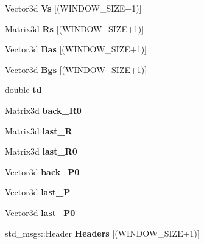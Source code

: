 \begin{DoxyCompactItemize}
Vector3d {\bfseries Vs} \mbox{[}(W\+I\+N\+D\+O\+W\+\_\+\+S\+I\+ZE+1)\mbox{]}
\item 
\mbox{\label{classEstimator_a95fb17a6e27d168aeecfea6debc5b654}} 
Matrix3d {\bfseries Rs} \mbox{[}(W\+I\+N\+D\+O\+W\+\_\+\+S\+I\+ZE+1)\mbox{]}
\item 
\mbox{\label{classEstimator_ab37b75b88457b47d77cb98d98c84313b}} 
Vector3d {\bfseries Bas} \mbox{[}(W\+I\+N\+D\+O\+W\+\_\+\+S\+I\+ZE+1)\mbox{]}
\item 
\mbox{\label{classEstimator_a75bcfcfcd62b388231812b7cf54d0609}} 
Vector3d {\bfseries Bgs} \mbox{[}(W\+I\+N\+D\+O\+W\+\_\+\+S\+I\+ZE+1)\mbox{]}
\item 
\mbox{\label{classEstimator_af5af4dd3209c9bb1cac39b28ca13ef9e}} 
double {\bfseries td}
\item 
\mbox{\label{classEstimator_ae25ec3c331182aa10cf93062a0013462}} 
Matrix3d {\bfseries back\+\_\+\+R0}
\item 
\mbox{\label{classEstimator_ae767a1f8631b2e48cdd2f5a5f94af4f8}} 
Matrix3d {\bfseries last\+\_\+R}
\item 
\mbox{\label{classEstimator_ad66c36afc29ed73dae943d7dbb93339c}} 
Matrix3d {\bfseries last\+\_\+\+R0}
\item 
\mbox{\label{classEstimator_a488253ad9835484585df51adde8f4bb8}} 
Vector3d {\bfseries back\+\_\+\+P0}
\item 
\mbox{\label{classEstimator_a3c69cfe5a1b003eb19c4869e3db6b7d7}} 
Vector3d {\bfseries last\+\_\+P}
\item 
\mbox{\label{classEstimator_a7739a4e119a156d5c544072289bfbad2}} 
Vector3d {\bfseries last\+\_\+\+P0}
\item 
\mbox{\label{classEstimator_ab0dfabed3a2b43af2edbb27034c00837}} 
std\+\_\+msgs\+::\+Header {\bfseries Headers} \mbox{[}(W\+I\+N\+D\+O\+W\+\_\+\+S\+I\+ZE+1)\mbox{]}
\item 

\end{DoxyCompactItemize}

